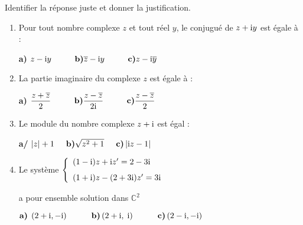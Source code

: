 \begin{exercice}
Identifier la réponse juste et donner la justification.
\begin{enumerate}
\item Pour tout nombre complexe $ z $ et tout réel $ y $, le conjugué de $z + \text{i} y$ est égale à :


\textbf{a)} $ z -\text{i} y \hspace*{1cm}\textbf{b)} \overline{z} - \text{i} y \hspace*{1cm} \textbf{c)} z - \text{i} \overline{y} $
\item La partie imaginaire du  complexe $ z $ est égale à :


\textbf{a)} $ \dfrac{z+ \overline{z}}{2} \hspace*{1cm} \textbf{b)} \dfrac{z- \overline{z}}{2\text{i}} \hspace*{1cm} \textbf{c)} \dfrac{z- \overline{z}}{2}$

\item   Le module  du  nombre complexe  $ z+\text{i}$  est  égal :


\textbf{a/\;\;} $ \left\lvert z \right\rvert +1 \hspace*{0.5cm} \textbf{b)} \sqrt{z^{2}+1} \hspace*{0.5cm} \textbf{c)} \left\lvert \text{i} z-1 \right\rvert $

\medskip 
\item Le système $ \left\{\begin{array}{l c l}
(1-\text{i})z +\text{i} z'=2-3\text{i} \\[0.25cm] 	 
 (1+\text{i})z -(2+3\text{i}) z'=3\text{i}
\end{array}\right. $


\medskip 
 a pour ensemble solution dans $ \mathbb{C}^2 $
 
 
 \medskip 
  $ \textbf{a)}\; \left(2+\text{i}, -\text{i}\right) \hspace*{1cm} \textbf{b)} \left(2+\text{i}, \;\text{i}\right) \hspace*{1cm} \textbf{c)} \left(2-\text{i}, -\text{i}\right) $ 

\end{enumerate}
\end{exercice}

